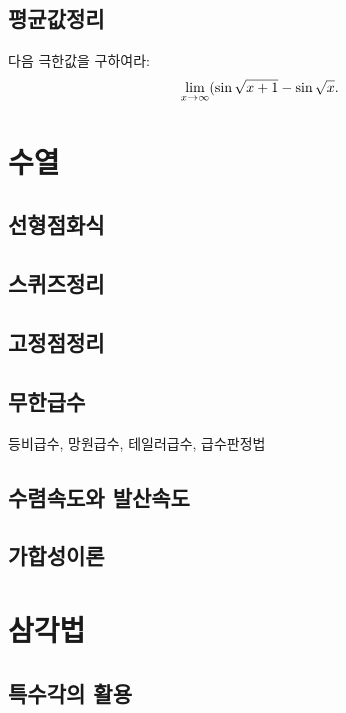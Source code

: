 \documentclass{../prb}
\begin{document}
\section{평균값정리}

\begin{prb}
다음 극한값을 구하여라:
\[\lim_{x\to\oo}(\sin\sqrt{x+1}-\sin\sqrt x.\]
\end{prb}







\chapter{수열}

\section{선형점화식}

\section{스퀴즈정리}

\section{고정점정리}

\section{무한급수}
등비급수, 망원급수, 테일러급수, 급수판정법

\section{수렴속도와 발산속도}

\section{가합성이론}











\chapter{삼각법}


\section{특수각의 활용}
\end{document}

